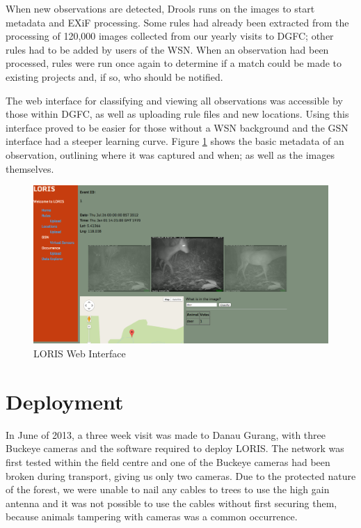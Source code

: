 				When new observations are detected, Drools runs on the images to start metadata and EXiF processing. Some rules had already been extracted from the processing of 120,000 images collected from our yearly visits to DGFC; other rules had to be added by users of the WSN. When an observation had been processed, rules were run once again to determine if a match could be made to existing projects and, if so, who should be notified.
				
				The web interface for classifying and viewing all observations was accessible by those within DGFC, as well as uploading rule files and new locations. Using this interface proved to be easier for those without a WSN background and the GSN interface had a steeper learning curve.	Figure \ref{fig:loris} shows the basic metadata of an observation, outlining where it was captured and when; as well as the images themselves.
				
				\begin{figure}[h]
				\centering
				\includegraphics[width=\textwidth]{Chap6/figures/loris}
				\caption{LORIS Web Interface}
				\label{fig:loris}
				\end{figure}
				
	\section{Deployment}\label{loris:dep}
		In June of 2013, a three week visit was made to Danau Gurang, with three Buckeye cameras and the software required to deploy LORIS. The network was first tested within the field centre and one of the Buckeye cameras had been broken during transport, giving us only two cameras. Due to the protected nature of the forest, we were unable to nail any cables to trees to use the high gain antenna and it was not possible to use the cables without first securing them, because animals tampering with cameras was a common occurrence.
		

